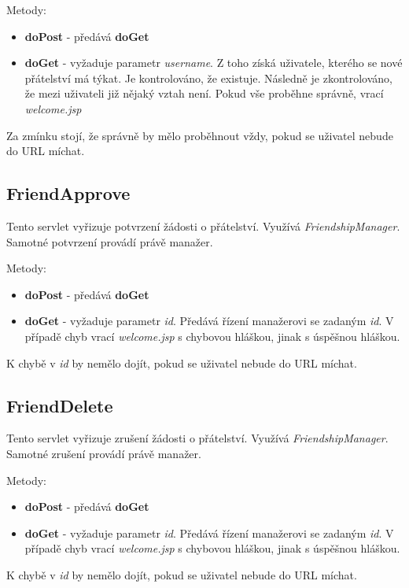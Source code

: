 \documentclass[
12pt,
a4paper,
pdftex,
czech,
titlepage
]{report}
\begin{document}
Metody:
\begin{itemize}
\item \textbf{doPost} - předává \textbf{doGet}
\item \textbf{doGet} - vyžaduje parametr \textit{username}. Z toho získá uživatele, kterého se nové přátelství má týkat. Je kontrolováno, že existuje. Následně je zkontrolováno, že mezi uživateli již nějaký vztah není. Pokud vše proběhne správně, vrací \textit{welcome.jsp}
\end{itemize}

Za zmínku stojí, že správně by mělo proběhnout vždy, pokud se uživatel nebude do URL míchat.

\subsection{FriendApprove}

Tento servlet vyřizuje potvrzení žádosti o přátelství. Využívá \textit{FriendshipManager}. Samotné potvrzení provádí právě manažer.

Metody:
\begin{itemize}
\item \textbf{doPost} - předává \textbf{doGet}
\item \textbf{doGet} - vyžaduje parametr \textit{id}. Předává řízení manažerovi se zadaným \textit{id}. V případě chyb vrací \textit{welcome.jsp} s chybovou hláškou, jinak s úspěšnou hláškou.
\end{itemize}

K chybě v \textit{id} by nemělo dojít, pokud se uživatel nebude do URL míchat.

\subsection{FriendDelete}

Tento servlet vyřizuje zrušení žádosti o přátelství. Využívá \textit{FriendshipManager}. Samotné zrušení provádí právě manažer.

Metody:
\begin{itemize}
\item \textbf{doPost} - předává \textbf{doGet}
\item \textbf{doGet} - vyžaduje parametr \textit{id}. Předává řízení manažerovi se zadaným \textit{id}. V případě chyb vrací \textit{welcome.jsp} s chybovou hláškou, jinak s úspěšnou hláškou.
\end{itemize}

K chybě v \textit{id} by nemělo dojít, pokud se uživatel nebude do URL míchat.
\end{document}
